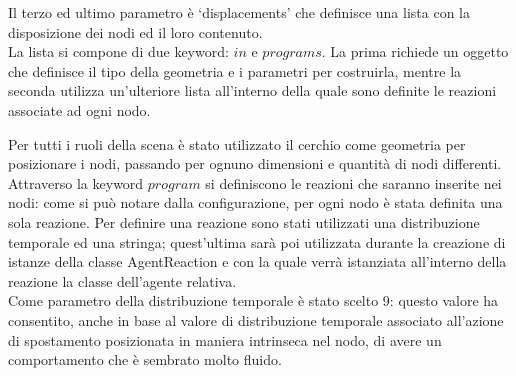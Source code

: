 Il terzo ed ultimo parametro è `displacements' che definisce una lista con la disposizione dei nodi ed il loro contenuto.
\\
La lista si compone di due keyword: $in$ e $programs$. La prima richiede un oggetto che definisce il tipo della geometria e i parametri per costruirla, mentre la seconda utilizza un'ulteriore lista all'interno della quale sono definite le reazioni associate ad ogni nodo.

Per tutti i ruoli della scena è stato utilizzato il cerchio come geometria per posizionare i nodi, passando per ognuno dimensioni e quantità di nodi differenti.
\\
Attraverso la keyword $program$ si definiscono le reazioni che saranno inserite nei nodi: come si può notare dalla configurazione, per ogni nodo è stata definita una sola reazione.
Per definire una reazione sono stati utilizzati una distribuzione temporale ed una stringa; quest'ultima sarà poi utilizzata durante la creazione di istanze della classe AgentReaction e con la quale verrà istanziata all'interno della reazione la classe dell'agente relativa.
\\
Come parametro della distribuzione temporale è stato scelto 9: questo valore ha consentito, anche in base al valore di distribuzione temporale associato all'azione di spostamento posizionata in maniera intrinseca nel nodo, di avere un comportamento che è sembrato molto fluido.